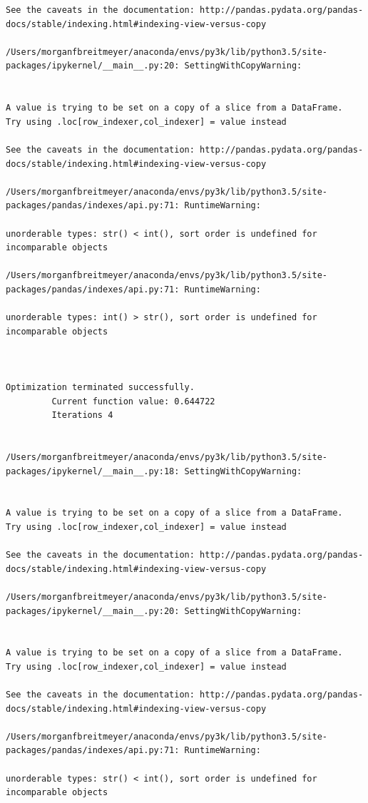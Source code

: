\begin{lstlisting}
See the caveats in the documentation: http://pandas.pydata.org/pandas-docs/stable/indexing.html#indexing-view-versus-copy

/Users/morganfbreitmeyer/anaconda/envs/py3k/lib/python3.5/site-packages/ipykernel/__main__.py:20: SettingWithCopyWarning:


A value is trying to be set on a copy of a slice from a DataFrame.
Try using .loc[row_indexer,col_indexer] = value instead

See the caveats in the documentation: http://pandas.pydata.org/pandas-docs/stable/indexing.html#indexing-view-versus-copy

/Users/morganfbreitmeyer/anaconda/envs/py3k/lib/python3.5/site-packages/pandas/indexes/api.py:71: RuntimeWarning:

unorderable types: str() < int(), sort order is undefined for incomparable objects

/Users/morganfbreitmeyer/anaconda/envs/py3k/lib/python3.5/site-packages/pandas/indexes/api.py:71: RuntimeWarning:

unorderable types: int() > str(), sort order is undefined for incomparable objects



Optimization terminated successfully.
         Current function value: 0.644722
         Iterations 4


/Users/morganfbreitmeyer/anaconda/envs/py3k/lib/python3.5/site-packages/ipykernel/__main__.py:18: SettingWithCopyWarning:


A value is trying to be set on a copy of a slice from a DataFrame.
Try using .loc[row_indexer,col_indexer] = value instead

See the caveats in the documentation: http://pandas.pydata.org/pandas-docs/stable/indexing.html#indexing-view-versus-copy

/Users/morganfbreitmeyer/anaconda/envs/py3k/lib/python3.5/site-packages/ipykernel/__main__.py:20: SettingWithCopyWarning:


A value is trying to be set on a copy of a slice from a DataFrame.
Try using .loc[row_indexer,col_indexer] = value instead

See the caveats in the documentation: http://pandas.pydata.org/pandas-docs/stable/indexing.html#indexing-view-versus-copy

/Users/morganfbreitmeyer/anaconda/envs/py3k/lib/python3.5/site-packages/pandas/indexes/api.py:71: RuntimeWarning:

unorderable types: str() < int(), sort order is undefined for incomparable objects


\end{lstlisting}
